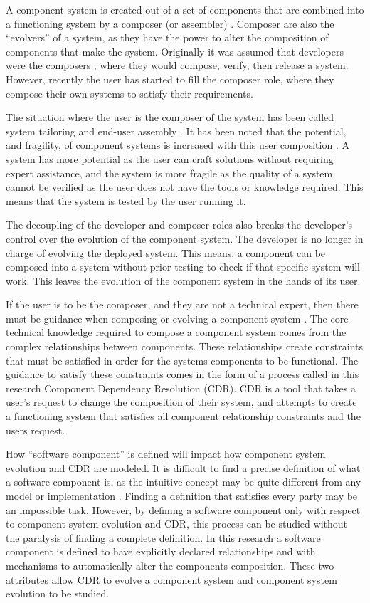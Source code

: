 A component system is created out of a set of components that are combined into a functioning system by a composer (or assembler) \citep{Szyperski2002}.
Composer are also the ``evolvers'' of a system, as they have the power to alter the composition of components that make the system.
Originally it was assumed that developers were the composers \citep{Parnas1972,PrietoDiaz1987}, where they would compose, verify, then release a system.
However, recently the user has started to fill the composer role, where they compose their own systems to satisfy their requirements.

The situation where the user is the composer of the system has been called system tailoring \citep{Morch1997} and end-user assembly \citep{Szyperski2002}. 
It has been noted that the potential, and fragility, of component systems is increased with this user composition \citep{Szyperski2002}.
A system has more potential as the user can craft solutions without requiring expert assistance,
and the system is more fragile as the quality of a system cannot be verified as the user does not have the tools or knowledge required.
This means that the system is tested by the user running it. 

The decoupling of the developer and composer roles also breaks the developer's control over the evolution of the component system.
The developer is no longer in charge of evolving the deployed system.
This means, a component can be composed into a system without prior testing to check if that specific system will work.
This leaves the evolution of the component system in the hands of its user.

If the user is to be the composer, and they are not a technical expert, then there must be guidance when composing or evolving a component system \citep{Szyperski2002}.
The core technical knowledge required to compose a component system comes from the complex relationships between components.
These relationships create constraints that must be satisfied in order for the systems components to be functional.
The guidance to satisfy these constraints comes in the form of a process called in this research Component Dependency Resolution (CDR).
CDR is  a tool that takes a user's request to change the composition of their system, and attempts to create a functioning system 
that satisfies all component relationship constraints and the users request.

How ``software component'' is defined will impact how component system evolution and CDR are modeled.
It is difficult to find a precise definition of what a software component is, as the intuitive concept may be quite different from any model or implementation \citep{Crnkovic2011}.
Finding a definition that satisfies every party may be an impossible task.
However, by defining a software component only with respect to component system evolution and CDR, 
this process can be studied without the paralysis of finding a complete definition.
In this research a software component is defined to have explicitly declared relationships and with mechanisms to automatically alter the components composition.
These two attributes allow CDR to evolve a component system and component system evolution to be studied. 


